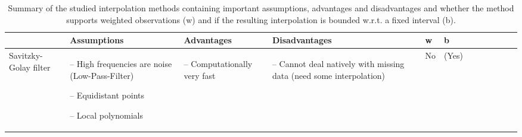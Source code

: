 \begin{table}[!ht]
	\centering
	\caption[skip=10pt]{Summary of the studied interpolation methods containing important assumptions, advantages and disadvantages and whether the method supports weighted observations (w) and if the resulting interpolation is bounded w.r.t. a fixed interval (b).}
	\small
	\begin{tabular}{p{1.6cm}p{3.3cm}p{3.3cm}p{3.4cm}p{0.4cm}p{0.4cm}p{3cm}p{3cm}p{3cm}p{3cm}p{2.7cm}p{3cm}|}
		\toprule
		~                                                                                                                                                            &
		\textbf{Assumptions}                                                                                                                                         &
		\textbf{Advantages}                                                                                                                                                &
		\textbf{Disadvantages}                                                                                                                                                &
		\textbf{w}                                                                                                                                      &
		\textbf{b}                                                                                                                                        \\ \hline

		Savitzky-Golay filter                                                                                                                                        &
		\begin{cptitemize}
			\item[--]  High frequencies are noise (Low-Pass-Filter) \item[--]  Equidistant points \item[--]  Local polynomials
		\end{cptitemize}                                              &
		\begin{cptitemize} \item[--]  Computationally very fast                                                                   \end{cptitemize}                   &
		\begin{cptitemize} \item[--]  Cannot deal natively with missing data (need some interpolation)                              \end{cptitemize}                 &
		No                                                                                                                                                           &
		(Yes)                                                                                                                                                         \\ \hline%


\end{tabular}
\end{table}
